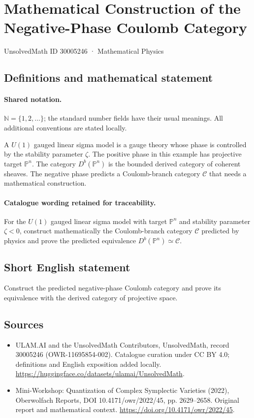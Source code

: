 \documentclass[11pt]{article}
\begin{document}
\setcounter{section}{30005245}
\section{Mathematical Construction of the Negative-Phase Coulomb Category}\label{30005246}
{\small UnsolvedMath ID 30005246 · Mathematical Physics}
\subsection{Definitions and mathematical statement}

\paragraph{Shared notation.}$\mathbb N=\{1,2,\ldots\}$; the standard number fields have their usual meanings. All additional conventions are stated locally.


A $U(1)$ gauged linear sigma model is a gauge theory whose phase is controlled by the stability parameter $\zeta$. The positive phase in this example has projective target $\mathbb P^n$. The category $D^b(\mathbb P^n)$ is the bounded derived category of coherent sheaves. The negative phase predicts a Coulomb-branch category $\mathcal C$ that needs a mathematical construction.

\paragraph{Catalogue wording retained for traceability.}
For the $U(1)$ gauged linear sigma model with target $\mathbb P^n$ and stability parameter $\zeta<0$, construct mathematically the Coulomb-branch category $\mathcal C$ predicted by physics and prove the predicted equivalence $D^b(\mathbb P^n)\simeq\mathcal C$.
\subsection{Short English statement}
Construct the predicted negative-phase Coulomb category and prove its equivalence with the derived category of projective space.
\subsection{Sources}
\begin{itemize}
\item[\hypertarget{source:30005246:1}{S1}] ULAM.AI and the UnsolvedMath Contributors, UnsolvedMath, record 30005246 (OWR-11695854-002). Catalogue curation under CC BY 4.0; definitions and English exposition added locally.
\url{https://huggingface.co/datasets/ulamai/UnsolvedMath}.
\item[\hypertarget{source:30005246:2}{S2}] Mini-Workshop: Quantization of Complex Symplectic Varieties (2022), Oberwolfach Reports, DOI 10.4171/owr/2022/45, pp. 2629--2658. Original report and mathematical context.
\url{https://doi.org/10.4171/owr/2022/45}.
\end{itemize}
\label{end:30005246}
\end{document}
